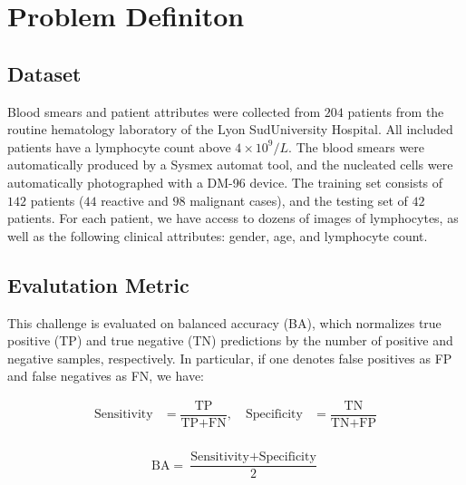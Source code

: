\documentclass[final]{cvpr}
\begin{document}
	\section{Problem Definiton}
	
	\subsection{Dataset}
	
	Blood smears and patient attributes were collected from $204$ patients from the routine hematology laboratory of the Lyon SudUniversity Hospital. All included patients have a lymphocyte count above $4\times10^9/L$. The blood smears were automatically produced by a Sysmex automat tool, and the nucleated cells were automatically photographed with a DM-96 device. The training set consists of $142$ patients ($44$ reactive and $98$ malignant cases), and the testing set of $42$ patients. For each patient, we have access to dozens of images of lymphocytes, as well as the following clinical attributes: gender, age, and lymphocyte count.
	
	\subsection{Evalutation Metric} 
	
	This challenge is evaluated on balanced accuracy (BA), which normalizes true positive (TP) and true negative (TN) predictions by the number of positive and negative samples, respectively. In particular, if one denotes false positives as FP and false negatives as FN, we have:
	
	\vspace{-2mm}
	
	\begin{equation*}
		\begin{aligned}
			\text{Sensitivity} & = \dfrac{\text{TP}}{\text{TP}+\text{FN}} ,\quad 
			\text{Specificity} & = \dfrac{\text{TN}}{\text{TN}+\text{FP}}\\
		\end{aligned}
	\end{equation*}

	\begin{equation*}
		\begin{aligned}
			\text{BA} = \dfrac{\text{Sensitivity}+\text{Specificity}}{2}
		\end{aligned}
	\end{equation*}
		
	\vspace{2mm}
	
\end{document}
